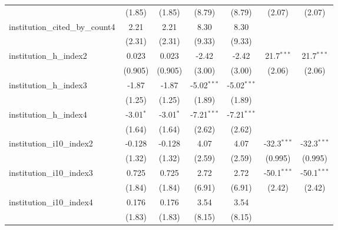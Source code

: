 \begin{tabular}{lcccccc}
                                         & (1.85)        & (1.85)        & (8.79)        & (8.79)        & (2.07)        & (2.07)\\   
   institution\_cited\_by\_count4        & 2.21          & 2.21          & 8.30          & 8.30          &               &   \\   
                                         & (2.31)        & (2.31)        & (9.33)        & (9.33)        &               &   \\   
   institution\_h\_index2                & 0.023         & 0.023         & -2.42         & -2.42         & 21.7$^{***}$  & 21.7$^{***}$\\   
                                         & (0.905)       & (0.905)       & (3.00)        & (3.00)        & (2.06)        & (2.06)\\   
   institution\_h\_index3                & -1.87         & -1.87         & -5.02$^{***}$ & -5.02$^{***}$ &               &   \\   
                                         & (1.25)        & (1.25)        & (1.89)        & (1.89)        &               &   \\   
   institution\_h\_index4                & -3.01$^{*}$   & -3.01$^{*}$   & -7.21$^{***}$ & -7.21$^{***}$ &               &   \\   
                                         & (1.64)        & (1.64)        & (2.62)        & (2.62)        &               &   \\   
   institution\_i10\_index2              & -0.128        & -0.128        & 4.07          & 4.07          & -32.3$^{***}$ & -32.3$^{***}$\\   
                                         & (1.32)        & (1.32)        & (2.59)        & (2.59)        & (0.995)       & (0.995)\\   
   institution\_i10\_index3              & 0.725         & 0.725         & 2.72          & 2.72          & -50.1$^{***}$ & -50.1$^{***}$\\   
                                         & (1.84)        & (1.84)        & (6.91)        & (6.91)        & (2.42)        & (2.42)\\   
   institution\_i10\_index4              & 0.176         & 0.176         & 3.54          & 3.54          &               &   \\   
                                         & (1.83)        & (1.83)        & (8.15)        & (8.15)        &               &   \\   

\end{tabular}
